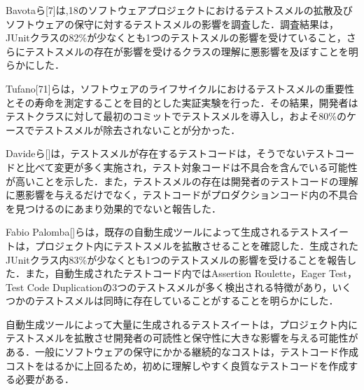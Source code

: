 \documentclass[12pt]{jarticle} %
\begin{document}

Bavotaら[7]は,18のソフトウェアプロジェクトにおけるテストスメルの拡散及びソフトウェアの保守に対するテストスメルの影響を調査した．調査結果は，JUnitクラスの82\%が少なくとも1つのテストスメルの影響を受けていること，さらにテストスメルの存在が影響を受けるクラスの理解に悪影響を及ぼすことを明らかにした．

Tufano[71]らは，ソフトウェアのライフサイクルにおけるテストスメルの重要性とその寿命を測定することを目的とした実証実験を行った．その結果，開発者はテストクラスに対して最初のコミットでテストスメルを導入し，およそ80\%のケースでテストスメルが除去されないことが分かった．

Davideら[]は，テストスメルが存在するテストコードは，そうでないテストコードと比べて変更が多く実施され，テスト対象コードは不具合を含んでいる可能性が高いことを示した．また，テストスメルの存在は開発者のテストコードの理解に悪影響を与えるだけでなく，テストコードがプロダクションコード内の不具合を見つけるのにあまり効果的でないと報告した．

Fabio Palomba[]らは，既存の自動生成ツールによって生成されるテストスイートは，プロジェクト内にテストスメルを拡散させることを確認した．生成されたJUnitクラス内83\%が少なくとも1つのテストスメルの影響を受けることを報告した．また，自動生成されたテストコード内ではAssertion Roulette，Eager Test，Test Code Duplicationの3つのテストスメルが多く検出される特徴があり，いくつかのテストスメルは同時に存在していることがすることを明らかにした．

自動生成ツールによって大量に生成されるテストスイートは，プロジェクト内にテストスメルを拡散させ開発者の可読性と保守性に大きな影響を与える可能性がある．一般にソフトウェアの保守にかかる継続的なコストは，テストコード作成コストをはるかに上回るため，初めに理解しやすく良質なテストコードを作成する必要がある．
\end{document}
